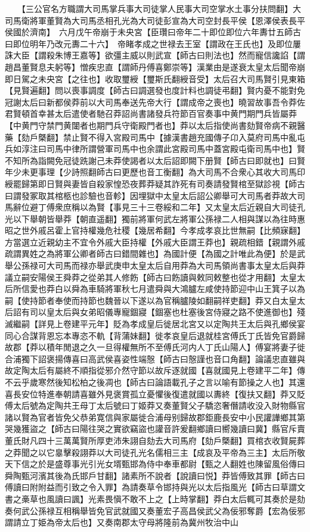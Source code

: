 　　【三公官名方職謂大司馬掌兵事大司徒掌人民事大司空掌水土事分扶問翻】大司馬衛將軍董賢為大司馬丞相孔光為大司徒彭宣為大司空封長平侯【恩澤侯表長平侯國於濟南】　六月戊午帝崩于未央宮【臣瓚曰帝年二十即位即位六年夀廿五師古曰即位明年乃改元夀二十六】　帝睹孝成之世禄去王室【謂政在王氏也】及即位屢誅大臣【謂殺朱博王嘉等】欲彊主威以則武宣【師古曰則法也】然而寵信讒諂【謂趙昌董賢息夫躬等】憎疾忠直【謂師丹傅喜鄭崇等】漢業由是遂衰太皇太后聞帝崩即日駕之未央宮【之往也】收取璽綬【璽斯氏翻綬音受】太后召大司馬賢引見東箱【見賢遍翻】問以喪事調度【師古曰調選發也度計料也調徒弔翻】賢内憂不能對免冠謝太后曰新都侯莽前以大司馬奉送先帝大行【謂成帝之喪也】曉習故事吾令莽佐君賢頓首幸甚太后遣使者馳召莽詔尚書諸發兵符節百官奏事中黄門期門兵皆屬莽【中黄門守禁門黄闥者也期門兵守衛殿門者也】莽以太后指使尚書劾賢帝病不親醫藥【劾戶槩翻】禁止賢不得入宮殿司馬中【據漢書趙充國傳子卬入莫府司馬中亂屯兵如淳注曰司馬中律所謂營軍司馬中也余謂此宮殿司馬中蓋宮殿屯衛司馬中也】賢不知所為詣闕免冠徒跣謝己未莽使謁者以太后詔即闕下册賢【師古曰即就也】曰賢年少未更事理【少詩照翻師古曰更歷也音工衡翻】為大司馬不合衆心其收大司馬印綬罷歸第即日賢與妻皆自殺家惶恐夜葬莽疑其詐死有司奏請發賢棺至獄診視【師古曰謂發冢取其棺柩也診驗也音軫】因埋獄中太皇太后詔公卿舉可大司馬者莽故大司馬辭位避丁傅衆庶稱以為賢【事見三十三卷綏和二年】又太皇太后近親自大司徒孔光以下舉朝皆舉莽【朝直遥翻】獨前將軍何武左將軍公孫禄二人相與謀以為往時惠昭之世外戚呂霍上官持權幾危社稷【幾居希翻】今孝成孝哀比世無嗣【比頻寐翻】方當選立近親幼主不宜令外戚大臣持權【外戚大臣謂王莽也】親疏相錯【親謂外戚疏謂異姓之為將軍公卿者師古曰錯間雜也】為國計便【為國之計唯此為便】於是武舉公孫禄可大司馬而禄亦舉武庚申太皇太后自用莽為大司馬領尚書事太皇太后與莽議立嗣安陽侯王舜莽之從弟其人修飭【師古曰飭讀與敕同敕整也從才用翻】太皇太后所信愛也莽白以舜為車騎將軍秋七月遣舜與大鴻臚左咸使持節迎中山王箕子以為嗣【使持節者奉使而持節也魏晉以下遂以為官稱臚陵如翻嗣祥吏翻】莽又白太皇太后詔有司以皇太后與女弟昭儀專寵錮寢【錮塞也杜塞後宮侍寢之路不使進御也】殘滅繼嗣【詳見上卷建平元年】貶為孝成皇后徙居北宮又以定陶共王太后與孔鄉侯宴同心合謀背恩忘本專恣不軌【背蒲妹翻】徙孝哀皇后退就桂宮傅氏丁氏皆免官爵歸故郡【莽以積年閒退之久一旦得權無所不至傅氏河内人丁氏山陽人】傅宴將妻子徙合浦獨下詔褒揚傳喜曰高武侯喜姿性端慤【師古曰慤謹也音口角翻】論議忠直雖與故定陶太后有屬終不順指從邪介然守節以故斥逐就國【喜就國見上卷建平二年】傳不云乎歲寒然後知松柏之後凋也【師古曰論語載孔子之言以喻有節操之人也】其還喜長安位特進奉朝請喜雖外見褒賞孤立憂懼後復遣就國以夀終【復扶又翻】莽又貶傅太后號為定陶共王母丁太后號曰丁姬莽又奏董賢父子驕恣奢僭請收没入財物縣官諸以賢為官者皆免父恭弟寛信與家屬徙合浦母别歸故郡鉅鹿長安中小民讙譁鄉其第哭幾獲盜之【師古曰陽往哭之實欲竊盜也讙音許爰翻鄉讀曰嚮幾讀曰冀】縣官斥賣董氏財凡四十三萬萬賢所厚吏沛朱詡自劾去大司馬府【劾戶槩翻】買棺衣收賢屍葬之莽聞之以它辠擊殺詡莽以大司徒孔光名儒相三主【成哀及平帝為三主】太后所敬天下信之於是盛尊事光引光女壻甄邯為侍中奉車都尉【甄之人翻姓也陳留風俗傳曰舜陶甄河濱其後為氏邯戶甘翻】諸素所不說者【說讀曰悦】莽皆傅致其罪【師古曰傅讀曰附附益而引致之令入罪】為請奏草令邯持與光以太后指風光【師古曰草謂文書之槀草也風讀曰諷】光素畏愼不敢不上之【上時掌翻】莽白太后輒可其奏於是劾奏何武公孫禄互相稱舉皆免官武就國又奏董宏子高昌侯武父為佞邪奪爵【宏為佞邪謂請立丁姫為帝太后也】又奏南郡太守母將隆前為冀州牧治中山